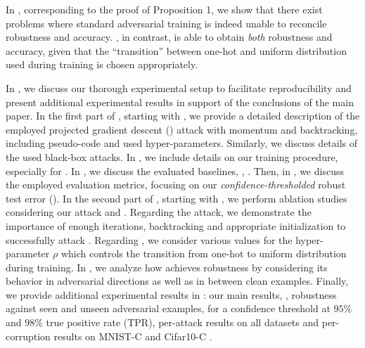 In , corresponding to the proof of Proposition 1, we show that there exist problems where standard adversarial training is indeed unable to reconcile robustness and accuracy. \ConfTrain, in contrast, is able to obtain \emph{both} robustness and accuracy, given that the ``transition'' between one-hot and uniform distribution used during training is chosen appropriately.

In , we discuss our thorough experimental setup to facilitate reproducibility and present additional experimental results in support of the conclusions of the main paper. In the first part of , starting with , we provide a detailed description of the employed projected gradient descent (\PGD) attack with momentum and backtracking, including pseudo-code and used hyper-parameters. Similarly, we discuss details of the used black-box attacks. In , we include details on our training procedure, especially for \ConfTrain. In , we discuss the evaluated baselines, \ie, \cite{MainiICML2020,MadryICLR2018,ZhangICML2019,LeeNIPS2018,MaICLR2018}. Then, in , we discuss the employed evaluation metrics, focusing on our \emph{confidence-thresholded} robust test error (\RTE). In the second part of , starting with , we perform ablation studies considering our attack and \ConfTrain. Regarding the attack, we demonstrate the importance of enough iterations, backtracking and appropriate initialization to successfully attack \ConfTrain. Regarding \ConfTrain, we consider various values for the hyper-parameter $\rho$ which controls the transition from one-hot to uniform distribution during training. In , we analyze how \ConfTrain achieves robustness by considering its behavior in adversarial directions as well as in between clean examples. Finally, we provide additional experimental results in : our main results, \ie, robustness against seen and unseen adversarial examples, for a confidence threshold at $95\%$ and $98\%$ true positive rate (TPR), per-attack results on all datasets and per-corruption results on MNIST-C \citep{MuICMLWORK2019} and Cifar10-C \citep{HendrycksARXIV2019}.